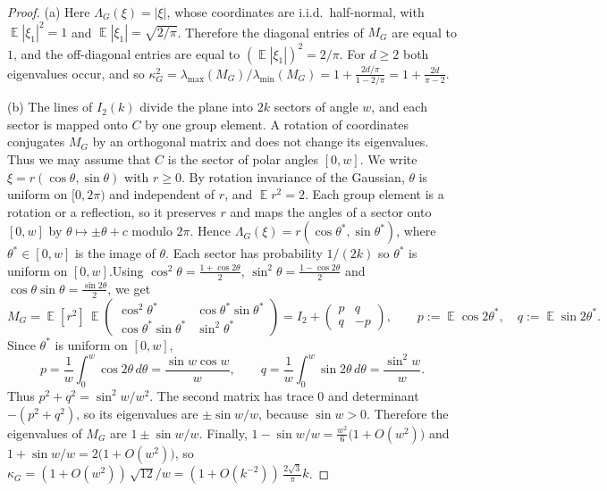 \documentclass[11pt]{article}
\theoremstyle{definition}
\DeclareMathOperator{\EX}{\mathbb{E}}
\begin{document}
\begin{proof}
	(a) Here $\Lambda_G(\xi)=|\xi|$, whose coordinates are i.i.d.\ half-normal, with
	$\EX|\xi_1|^2=1$ and $\EX|\xi_1|=\sqrt{2/\pi}$. Therefore the diagonal entries of $M_G$ are equal to
	$1$, and the off-diagonal entries are equal to $(\EX|\xi_1|)^2=2/\pi$. For $d\ge2$ both eigenvalues occur, and so
	$\kappa_G^2=\lambda_{\max}(M_G)/\lambda_{\min}(M_G)=1+\frac{2d/\pi}{1-2/\pi}=1+\frac{2d}{\pi-2}$.

	(b) The lines of $I_2(k)$ divide the plane into $2k$ sectors of angle
	$w$, and each sector is mapped onto $C$ by one group element. A rotation of
	coordinates conjugates $M_G$ by an orthogonal matrix and does not change its
	eigenvalues. Thus we may assume that $C$ is the sector of polar angles $[0,w]$. We write
	$\xi=r(\cos\theta,\sin\theta)$ with $r\ge0$. By rotation invariance of the Gaussian,
	$\theta$ is uniform on $[0,2\pi)$ and independent of $r$, and $\EX r^2=2$. Each group
	element is a rotation or a reflection, so it preserves $r$ and maps the angles of a
	sector onto $[0,w]$ by $\theta\mapsto\pm\theta+c$ modulo $2\pi$. Hence
	$\Lambda_G(\xi)=r(\cos\theta^*,\sin\theta^*)$, where $\theta^*\in[0,w]$ is the image of
	$\theta$. Each sector has probability $1/(2k)$
	so $\theta^*$ is uniform on $[0,w]$.Using $\cos^2\theta=\frac{1+\cos2\theta}2$,
	$\sin^2\theta=\frac{1-\cos2\theta}2$ and $\cos\theta\sin\theta=\frac{\sin2\theta}2$, we
	get
	\[
	M_G=\EX[r^2]\,\EX\begin{pmatrix}\cos^2\theta^*&\cos\theta^*\sin\theta^*\\
	\cos\theta^*\sin\theta^*&\sin^2\theta^*\end{pmatrix}
	=I_2+\begin{pmatrix}p&q\\q&-p\end{pmatrix},
	\qquad p:=\EX\cos2\theta^*,\quad q:=\EX\sin2\theta^*.
	\]
	Since $\theta^*$ is uniform on $[0,w]$,
	\[
	p=\frac1w\int_0^w\cos2\theta\,d\theta=\frac{\sin w\cos w}{w},
	\qquad
	q=\frac1w\int_0^w\sin2\theta\,d\theta=\frac{\sin^2w}{w}.
	\]
	Thus $p^2+q^2=\sin^2w/w^2$. The second matrix has trace $0$ and determinant
	$-(p^2+q^2)$, so its eigenvalues are $\pm\sin w/w$, because $\sin w>0$. Therefore the eigenvalues of $M_G$ are $1\pm\sin w/w$. Finally, $1-\sin w/w=\tfrac{w^2}{6}\bigl(1+O(w^2)\bigr)$ and
	$1+\sin w/w=2\bigl(1+O(w^2)\bigr)$, so
	$\kappa_G=(1+O(w^2))\,\sqrt{12}/w=(1+O(k^{-2}))\,\tfrac{2\sqrt3}{\pi}k$.
\end{proof}
\end{document}

